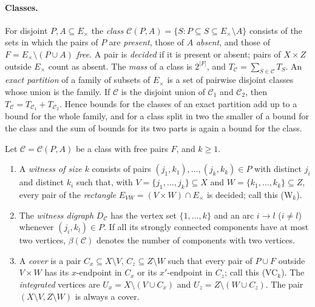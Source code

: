 \paragraph{Classes.}
For disjoint $P,A\subseteq E_\times$ the \emph{class}
$\mathcal C(P,A)=\{S:P\subseteq S\subseteq E_\times\setminus A\}$ consists of the
sets in which the pairs of $P$ are \emph{present}, those of $A$ \emph{absent}, and
those of $F=E_\times\setminus(P\cup A)$ \emph{free}. A pair is \emph{decided} if it
is present or absent; pairs of $X\times Z$ outside $E_\times$ count as absent. The
\emph{mass} of a class is $2^{|F|}$, and $T_{\mathcal C}=\sum_{S\in\mathcal C}T_S$.
An \emph{exact partition} of a family of subsets of $E_\times$ is a set of
pairwise disjoint classes whose union is the family. If $\mathcal C$ is the
disjoint union of $\mathcal C_1$ and $\mathcal C_2$, then
$T_{\mathcal C}=T_{\mathcal C_1}+T_{\mathcal C_2}$. Hence bounds for the classes
of an exact partition add up to a bound for the whole family, and for a class
split in two the smaller of a bound for the class and the sum of bounds for its
two parts is again a bound for the class.

\begin{definition}\label{def:extraction:witness}
Let $\mathcal C=\mathcal C(P,A)$ be a class with free pairs $F$, and $k\ge1$.
\begin{enumerate}[label=\textup{(\alph*)}]
\item A \emph{witness of size $k$} consists of pairs
 $(j_1,k_1),\dots,(j_k,k_k)\in P$ with distinct $j_i$ and distinct $k_i$ such
 that, with $V=\{j_1,\dots,j_k\}\subseteq X$ and $W=\{k_1,\dots,k_k\}\subseteq Z$,
 every pair of the \emph{rectangle} $E_{VW}=(V\times W)\cap E_\times$ is decided;
 call this \textup{(W$_k$)}.
\item The \emph{witness digraph} $D_{\mathcal C}$ has the vertex set
 $\{1,\dots,k\}$ and an arc $i\to l$ ($i\ne l$) whenever $(j_i,k_l)\in P$. If
 all its strongly connected components have at most two vertices,
 $\beta(\mathcal C)$ denotes the number of components with two vertices.
\item A \emph{cover} is a pair $C_x\subseteq X\setminus V$, $C_z\subseteq
 Z\setminus W$ such that every pair of $P\cup F$ outside $V\times W$ has its
 $x$-endpoint in $C_x$ or its $x'$-endpoint in $C_z$; call this
 \textup{(VC$_k$)}. The \emph{integrated} vertices are
 $U_x=X\setminus(V\cup C_x)$ and $U_z=Z\setminus(W\cup C_z)$. The pair
 $(X\setminus V,Z\setminus W)$ is always a cover.
\end{enumerate}
\end{definition}

